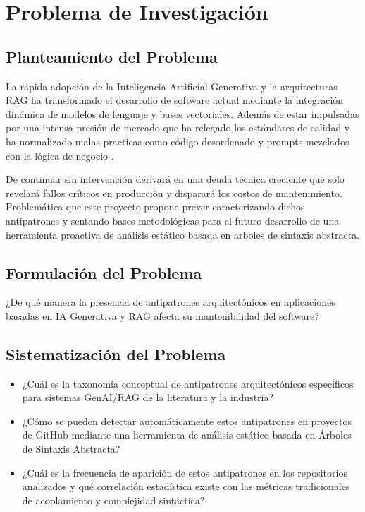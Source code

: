 \section{Problema de Investigación}
 
\subsection{Planteamiento del Problema}

La rápida adopción de la Inteligencia Artificial Generativa y la arquitecturas RAG ha transformado el desarrollo de software actual mediante la integración dinámica de modelos de lenguaje y bases vectoriales. Además de estar impulsadas por una intensa presión de mercado que ha relegado los estándares de calidad y ha normalizado malas practicas como código desordenado y prompts mezclados con la lógica de negocio \cite{shao_are_2024}.

De continuar sin intervención derivará en una deuda técnica creciente que solo revelará fallos críticos en producción y disparará los costos de mantenimiento. Problemática que este proyecto propone prever caracterizando dichos antipatrones y sentando bases metodológicas para el futuro desarrollo de una herramienta proactiva de análisis estático basada en arboles de sintaxis abstracta.
 
\subsection{Formulación del Problema}
 
¿De qué manera la presencia de antipatrones arquitectónicos en aplicaciones basadas en IA Generativa y RAG afecta su mantenibilidad del software?
 
\subsection{Sistematización del Problema}
 
\begin{itemize}
    \item ¿Cuál es la taxonomía conceptual de antipatrones arquitectónicos específicos para sistemas GenAI/RAG de la literatura y la industria?
    \item ¿Cómo se pueden detectar automáticamente estos antipatrones en proyectos de GitHub mediante una herramienta de análisis estático basada en Árboles de Sintaxis Abstracta?
    \item ¿Cuál es la frecuencia de aparición de estos antipatrones en los repositorios analizados y qué correlación estadística existe con las métricas tradicionales de acoplamiento y complejidad sintáctica?
\end{itemize}